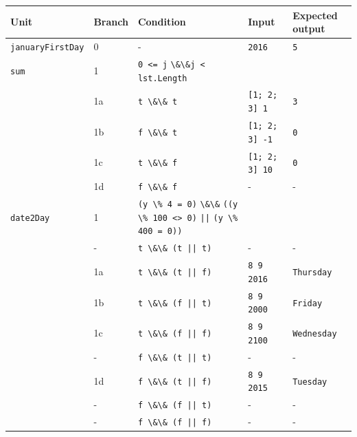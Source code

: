 \documentclass[fsharpNotes.tex]{subfiles}
\begin{document}
\begin{enumerate}
\begin{table}
     \begin{center}
       \setlength{\tabcolsep}{3pt}
       \begin{tabularx}{\linewidth}{|l|l|p{3.5cm}|l|X|}
         \hline
         \rowcolor{headerRowColor} Unit & Branch & Condition & Input & Expected output\\
         \hline
         \lstinline{januaryFirstDay} & 0 & -& \lstinline{2016} & \lstinline{5}\\
         \hline
         \lstinline{sum} 
         & 1 & \lstinline{0 <= j} \lstinline{\&\&}\newline\hspace*{0.5em}\lstinline{j < lst.Length} &&\\
         & 1a & \lstinline{t \&\& t} & \lstinline{[1; 2; 3] 1} & \lstinline{3}\\
         & 1b & \lstinline{f \&\& t} & \lstinline{[1; 2; 3] -1} & \lstinline{0}\\
         & 1c & \lstinline{t \&\& f} & \lstinline{[1; 2; 3] 10} & \lstinline{0}\\
         & 1d & \lstinline{f \&\& f} & - & -\\
         \hline
         \lstinline{date2Day} & 1 & \lstinline{(y \% 4 = 0)} \lstinline{\&\&}\newline
         \hspace*{0.5em}\lstinline{((y \% 100 <> 0)}\newline
         \hspace*{1em}\lstinline{||}\newline
         \hspace*{1.5em}\lstinline{(y \% 400 = 0))} &  & \\
         & - & \lstinline{t \&\& (t || t)} & - & -\\
         & 1a & \lstinline{t \&\& (t || f)} & \lstinline{8 9 2016} & \lstinline{Thursday}\\
         & 1b & \lstinline{t \&\& (f || t)} & \lstinline{8 9 2000} & \lstinline{Friday}\\
         & 1c & \lstinline{t \&\& (f || f)} & \lstinline{8 9 2100} & \lstinline{Wednesday}\\
         & - & \lstinline{f \&\& (t || t)} & - & -\\
         & 1d & \lstinline{f \&\& (t || f)} & \lstinline{8 9 2015} & \lstinline{Tuesday}\\
         & - & \lstinline{f \&\& (f || t)} & - & -\\
         & - & \lstinline{f \&\& (f || f)} & - & -\\

\end{tabularx}
\end{center}
\end{table}
\end{enumerate}
\end{document}
